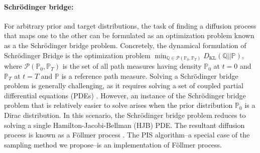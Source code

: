 \paragraph{Schr\"odinger bridge:}
For arbitrary prior and target distributions, the task of finding a diffusion process that maps one to the other can be formulated as an optimization problem known as a the Schr\"odinger bridge problem. Concretely, the dynamical formulation of Schr\"odinger Bridge is the optimization problem $\min_{\mathbb{Q}\in\mathcal{P}(\mathbb{P}_0,\mathbb{P}_T)} D_{\text{KL}}(\mathbb{Q}||\mathbb{P})$, where $\mathcal{P}(\mathbb{P}_0,\mathbb{P}_T)$ is the set of all path measures having density $\mathbb{P}_0$ at $t=0$ and $\mathbb{P}_T$ at $t=T$ and $\mathbb{P}$ is a reference path measure. Solving a Schr\"odinger bridge problem is generally challenging, as it requires solving a set of coupled partial differential equations (PDEs) \cite{chen_likelihood_2021}. However, an instance of the Schrödinger bridge problem that is relatively easier to solve arises when the prior distribution $\mathbb{P}_0$ is a Dirac distribution. In this scenario, the Schrödinger bridge problem reduces to solving a single Hamilton-Jacobi-Bellman (HJB) PDE. The resultant diffusion process is known as a F\"ollmer process \cite{follmer_time_1986}. The PIS \cite{zhang_path_2022} algorithm--a special case of the sampling method we propose--is an implementation of F\"ollmer process.

